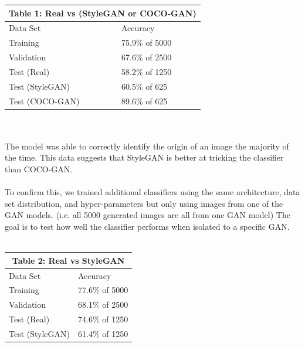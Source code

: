 \documentclass[12pt]{article}
\begin{document}
\begin{multicols*}{2}
        \begin{tabular}{ |p{4cm}|p{3cm}|  }
         \hline
         \multicolumn{2}{|c|}{Table 1: Real vs (StyleGAN or COCO-GAN)} \\
         \hline
        Data Set     & Accuracy\\
         \hline
        Training        & 75.9\% of 5000 \\
         \hline
        Validation      & 67.6\% of 2500 \\
         \hline
        Test (Real)     & 58.2\% of 1250 \\
         \hline
        Test (StyleGAN) & 60.5\% of 625  \\
         \hline
        Test (COCO-GAN) & 89.6\% of 625 \\
         \hline
        \end{tabular}
        \\\\
        The model was able to correctly identify the origin of an image the majority of the time.
        This data suggests that StyleGAN is better at tricking the classifier than COCO-GAN.
        \\\\
        To confirm this, we trained additional classifiers using the same architecture, data set distribution, and hyper-parameters but only using images from one of the GAN models.
        (i.e. all 5000 generated images are all from one GAN model)
        The goal is to test how well the classifier performs when isolated to a specific GAN.\\\\
        \begin{tabular}{ |p{4cm}|p{3cm}|  }
             \hline
             \multicolumn{2}{|c|}{Table 2: Real vs StyleGAN} \\
             \hline
            Data Set     & Accuracy\\
             \hline
            Training        & 77.6\% of 5000 \\
             \hline
            Validation      & 68.1\% of 2500 \\
             \hline
            Test (Real)     & 74.6\% of 1250 \\
             \hline
            Test (StyleGAN) & 61.4\% of 1250  \\
             \hline
        \end{tabular}\\
        \begin{tabular}{ |p{4cm}|p{3cm}|  }

\end{tabular}
\end{multicols*}
\end{document}
